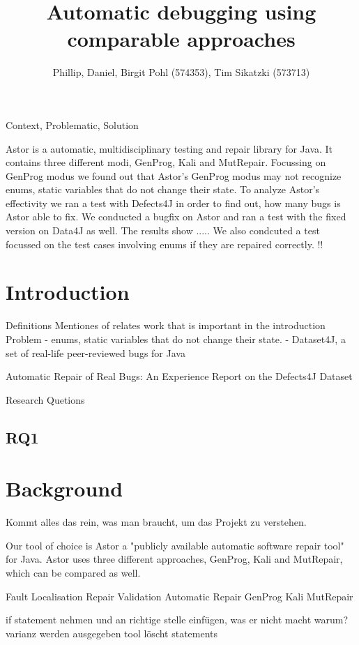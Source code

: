 \documentclass[pdftex,english,oribibl]{llncs}
\title{Automatic debugging using comparable approaches}
\author{Phillip, Daniel, Birgit Pohl (574353), Tim Sikatzki (573713)}
\institute{Humboldt University of Berlin\\Department of Computer Science\\12489 Berlin, Germany}
\makeatletter
\gdef\@keywords{}
\renewenvironment{abstract}{%
  \list{}{\advance\topsep by0.35cm\relax\small%
          \leftmargin=1cm%
          \labelwidth=\z@%
          \listparindent=\z@%
          \itemindent\listparindent%
          \rightmargin\leftmargin}%
          \item[\hskip\labelsep\bfseries\abstractname]}{%
  \if!\@keywords!\else{\item[~]\item[\hskip\labelsep\bfseries\keywordname]\@keywords}\fi%
  \endlist}
\makeatother
\begin{document}
\maketitle

\begin{abstract}
  Context, Problematic, Solution

Astor is a automatic, multidisciplinary testing and repair library for Java. It contains three different modi, GenProg, Kali and MutRepair. Focussing on GenProg modus we found out that Astor's GenProg modus may not recognize enums, static variables that do not change their state.
To analyze Astor's effectivity we ran a test with Defects4J in order to find out, how many bugs is Astor able to fix. We conducted a bugfix on Astor and ran a test with the fixed version on Data4J as well. The results show .....
We also condcuted a test focussed on the test cases involving enums if they are repaired correctly.
\end{abstract}

\section{Introduction}
Definitions
Mentiones of relates work that is important in the introduction
Problem
- enums, static variables that do not change their state.
-  Dataset4J, a set of real-life peer-reviewed bugs for Java

Automatic Repair of Real Bugs: An Experience Report on
the Defects4J Dataset

Research Quetions
\subsection{RQ1}\label{rq1}

\section{Background}\label{sec:background}
Kommt alles das rein, was man braucht, um das Projekt zu verstehen. 

Our tool of choice is Astor a "publicly available automatic software repair tool"  for Java. Astor uses three different approaches, GenProg, Kali and MutRepair, which can be compared as well.

Fault Localisation
Repair Validation
Automatic Repair
GenProg
Kali
MutRepair



if statement nehmen und an richtige stelle einfügen, was er nicht macht
warum? varianz werden ausgegeben
tool löscht statements \cite{salam}
\end{document}
